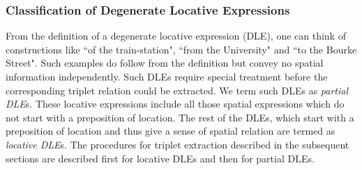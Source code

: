 \documentclass{acm_proc_article-sp}
\begin{document}
\subsubsection*{Classification of Degenerate Locative Expressions}
From the definition of a degenerate locative expression (DLE), one can think of constructions like ``of the train-station", ``from the University" and ``to the Bourke Street". Such examples do follow from the definition but convey no spatial information independently. Such DLEs require special treatment before the corresponding triplet relation could be extracted. We term such DLEs as \textit{partial DLE}s. These locative expressions include all those spatial expressions which do not start with a preposition of location.
The rest of the DLEs, which start with a preposition of location and thus give a sense of spatial relation are termed as \textit{locative DLE}s. The procedures for triplet extraction described in the subsequent sections are described first for locative DLEs and then for partial DLEs. 
\end{document}
